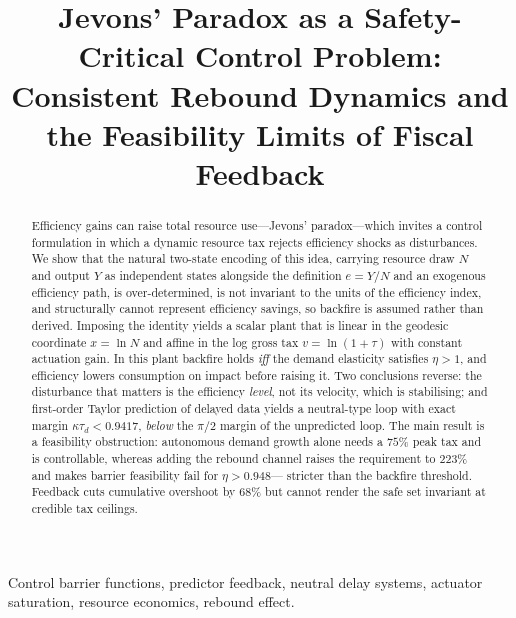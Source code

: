 \documentclass[conference,letterpaper,10pt]{IEEEtran}
\theoremstyle{plain}
\theoremstyle{remark}
\begin{document}
\title{Jevons' Paradox as a Safety-Critical Control Problem:\\
Consistent Rebound Dynamics and the Feasibility Limits of Fiscal Feedback}

\author{
%
}

\maketitle
\thispagestyle{empty}

\begin{abstract}
Efficiency gains can raise total resource use---Jevons' paradox---which
invites a control formulation in which a dynamic resource tax rejects
efficiency shocks as disturbances. We show that the natural two-state
encoding of this idea, carrying resource draw $N$ and output $Y$ as
independent states alongside the definition $e=Y/N$ and an exogenous
efficiency path, is over-determined, is not invariant to the units of
the efficiency index, and structurally cannot represent efficiency
savings, so backfire is assumed rather than derived. Imposing the
identity yields a scalar plant that is linear in the geodesic
coordinate $x=\ln N$ and affine in the log gross tax $v=\ln(1+\tau)$
with constant actuation gain. In this plant backfire holds \emph{iff}
the demand elasticity satisfies $\eta>1$, and efficiency lowers
consumption on impact before raising it. Two conclusions reverse: the
disturbance that matters is the efficiency \emph{level}, not its
velocity, which is stabilising; and first-order Taylor prediction of
delayed data yields a neutral-type loop with exact margin
$\kappa\tau_d<0.9417$, \emph{below} the $\pi/2$ margin of the
unpredicted loop. The main result is a feasibility obstruction:
autonomous demand growth alone needs a $75\%$ peak tax and is
controllable, whereas adding the rebound channel raises the requirement
to $223\%$ and makes barrier feasibility fail for $\eta>0.948$---%
stricter than the backfire threshold. Feedback cuts cumulative
overshoot by $68\%$ but cannot render the safe set invariant at
credible tax ceilings.
\end{abstract}

\begin{IEEEkeywords}
Control barrier functions, predictor feedback, neutral delay systems,
actuator saturation, resource economics, rebound effect.
\end{IEEEkeywords}
\end{document}
